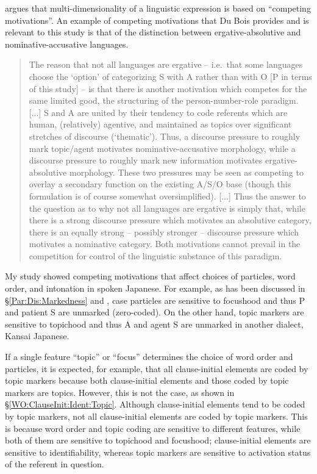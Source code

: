  argues that multi-dimensionality of a linguistic expression is based on ``competing motivations''.
An example of competing motivations that Du Bois provides and is relevant to this study is
that of the distinction between ergative-absolutive and nominative-accusative languages.
%
\begin{quote}
The reason that not all languages are ergative -- i.e.~that some languages choose the `option' of categorizing S with A rather than with O [P in terms of this study] -- 
is that there is another motivation which competes for the same limited good,
the structuring of the person-number-role paradigm. [...]
S and A are united by their tendency to code referents which are human,
(relatively) agentive, and maintained as topics over significant stretches of discourse (`thematic').
Thus, a discourse pressure to roughly mark topic/agent motivates nominative-accusative morphology,
while a discourse pressure to roughly mark new information motivates ergative-absolutive morphology.
These two pressures may be seen as competing to overlay a secondary function on the existing A/S/O base (though this formulation is of course somewhat oversimplified). [...]
Thus the answer to the question as to why not all languages are ergative is simply that,
while there is a strong discourse pressure which motivates an absolutive category, there is an equally strong -- possibly stronger --
discourse pressure which motivates a nominative category.
Both motivations cannot prevail in the competition for control of the linguistic substance of this paradigm.
\cite[354--355]{dubois85}
\end{quote}
%
My study showed competing motivations that affect
choices of particles, word order, and intonation in spoken Japanese.
For example,
as has been discussed in \S \ref{Par:Dis:Markedness} and ,
case particles are sensitive to focushood and thus
P and patient S are unmarked (zero-coded).
On the other hand, topic markers are sensitive to topichood and thus
A and agent S are unmarked in another dialect, Kansai Japanese.

If a single feature ``topic'' or ``focus'' determines the choice of word order and particles,
it is expected, for example, that
all clause-initial elements are coded by topic markers
because both clause-initial elements and those coded by topic markers are topics.
However, this is not the case,
as shown in \S \ref{WO:ClauseInit:Ident:Topic}.
Although clause-initial elements tend to be coded by topic markers,
not all clause-initial elements are coded by topic markers.
This is because word order and topic coding are sensitive to different features, while both of them are sensitive to topichood and focushood; clause-initial elements are sensitive to identifiability,
whereas topic markers are sensitive to activation status of the referent in question.

